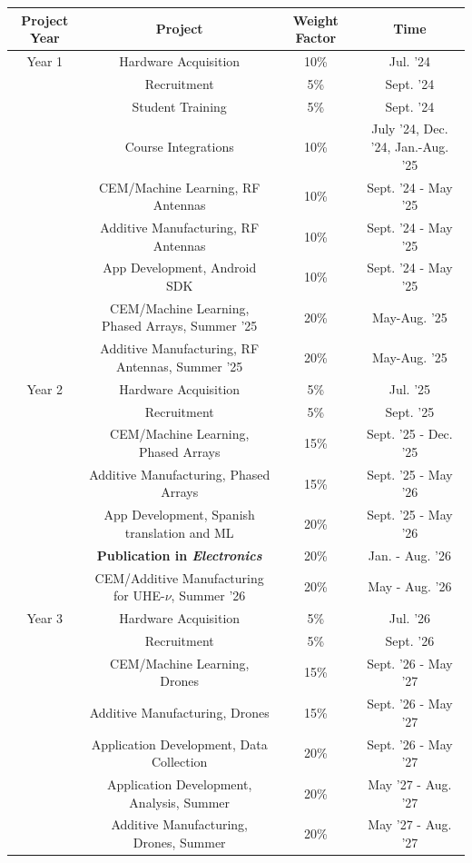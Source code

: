\documentclass[../../main.tex]{subfiles}
\begin{document}
\begin{table}[ht]
\footnotesize
\centering
\begin{tabular}{c | c | c | c}
Project Year & Project & Weight Factor & Time \\ \hline
Year 1 & Hardware Acquisition & 10\% & Jul. '24 \\
 & Recruitment & 5\% & Sept. '24 \\ 
 & Student Training & 5\% & Sept. '24 \\
 & Course Integrations & 10\% & July '24, Dec. '24, Jan.-Aug. '25 \\
 & CEM/Machine Learning, RF Antennas & 10\% & Sept. '24 - May '25 \\
 & Additive Manufacturing, RF Antennas & 10\% & Sept. '24 - May '25 \\
 & App Development, Android SDK & 10\% & Sept. '24 - May '25 \\
 & CEM/Machine Learning, Phased Arrays, Summer '25 & 20\% & May-Aug. '25 \\
 & Additive Manufacturing, RF Antennas, Summer '25 & 20\% & May-Aug. '25 \\
\hline
Year 2 & Hardware Acquisition & 5\% & Jul. '25 \\ 
 & Recruitment & 5\% & Sept. '25 \\
 & CEM/Machine Learning, Phased Arrays & 15\% & Sept. '25 - Dec. '25 \\
 & Additive Manufacturing, Phased Arrays & 15\% & Sept. '25 - May '26 \\
 & App Development, Spanish translation and ML & 20\% & Sept. '25 - May '26 \\
 & \textbf{Publication in \textit{Electronics}} & 20\% & Jan. - Aug. '26 \\
 & CEM/Additive Manufacturing for UHE-$\nu$, Summer '26 & 20\% & May - Aug. '26 \\
\hline
Year 3 & Hardware Acquisition & 5\% & Jul. '26 \\
 & Recruitment & 5\% & Sept. '26 \\
 & CEM/Machine Learning, Drones & 15\% & Sept. '26 - May '27 \\
 & Additive Manufacturing, Drones & 15\% & Sept. '26 - May '27 \\
 & Application Development, Data Collection & 20\% & Sept. '26 - May '27 \\
 & Application Development, Analysis, Summer & 20\% & May '27 - Aug. '27 \\
 & Additive Manufacturing, Drones, Summer & 20\% & May '27 - Aug. '27 \\

\end{tabular}
\end{table}
\end{document}
